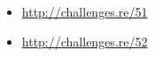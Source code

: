 \section{\Exercises}

\begin{itemize}
	\item \url{http://challenges.re/51}
	\item \url{http://challenges.re/52}
\end{itemize}

